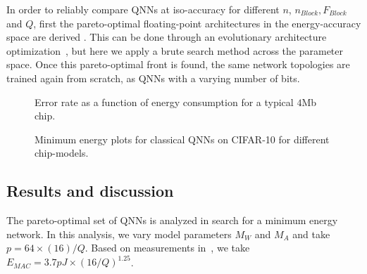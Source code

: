 \documentclass[article,10pt]{IEEEtran}
\begin{document}
In order to reliably compare QNNs at iso-accuracy for different $n$, $n_{Block}, F_{Block}$ and $Q$, first the pareto-optimal floating-point architectures in the energy-accuracy space are derived . This can be done through an evolutionary architecture optimization~\cite{real2017large}, but here we apply a brute search method across the parameter space. Once this pareto-optimal front is found, the same network topologies are trained again from scratch, as QNNs with a varying number of bits.

\begin{figure*}[t]
     \centerline{
     \hfill
     \hfill
     }
     \caption{Error rate as a function of energy consumption for a typical $4$Mb chip. }
     \label{fig:energy_combo}
\end{figure*}

\begin{figure*}[t]
     \centering
     \hfill
     \hfill
     \caption{Minimum energy plots for classical QNNs on CIFAR-10 for different chip-models.}
     \label{fig:minimum_energy_point_cifar10}
\end{figure*}


\subsection{Results and discussion}
\label{subsec:results_and_discussion}

The pareto-optimal set of QNNs is analyzed in search for a minimum energy network. In this analysis, we vary model parameters $M_W$ and $M_A$ and take $p=64\times (16)/Q$. 
Based on measurements in~\cite{moons2017envision}, we take $E_{MAC}=3.7pJ \times (16/Q)^{1.25}$. 
\end{document}
